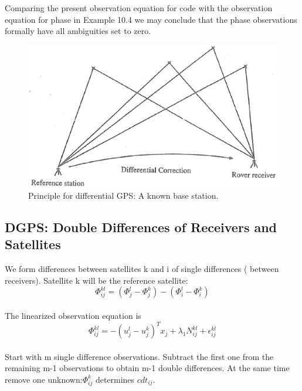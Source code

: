 Comparing the present observation equation for code with the observation equation for phase in Example 10.4 we may conclude that the phase observations formally have all ambiguities set to zero.

\begin{figure}
	\centering
	\includegraphics[width=0.4\linewidth]{TeX_files/Part03/chapter10/image/9-4}
	\caption{Principle for differential GPS: A known base station.}
	\label{fig:9-4}
\end{figure}

\subsection{DGPS: Double Differences of Receivers and Satellites}

We form differences between satellites k and i of single differences ( between receivers).
Satellite k will be the reference satellite:
\begin{equation}
\Phi_{ij}^{kl}=(\Phi_{j}^{l}-\Phi_{j}^{k})-(\Phi_{i}^{l}-\Phi_{i}^{k})
\end{equation}\\
The linearized observation equation is
$$
\Phi_{ij}^{kl}=-(u_{j}^{l}-u_{j}^{k})^{T}x_{j}+\lambda_{1}N_{ij}^{kl}+\epsilon_{ij}^{kl}
$$\\
Start with m single difference observations. Subtract the first one from the remaining m-1
observations to obtain m-1 double differences. At the same time remove one unknown:$\Phi_{ij}^{k}$ determines $cdt_{ij}$.

